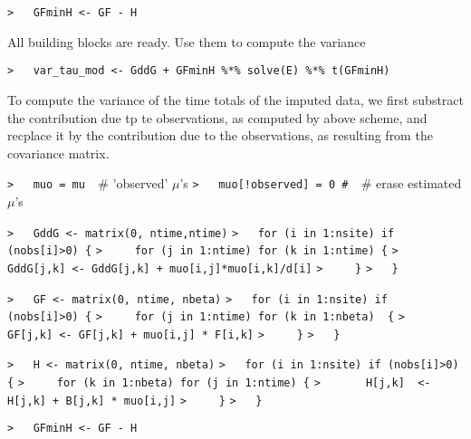 \documentclass[a4paper]{article}
\begin{document}
\verb~>   GFminH <- GF - H~\par

All building blocks are ready. Use them to compute the variance\par
\verb~>   var_tau_mod <- GddG + GFminH %*% solve(E) %*% t(GFminH)~\par

To compute the variance of the time totals of the imputed data, we first
substract the contribution due tp te observations, as computed by above scheme,
and recplace it by the contribution due to the observations, as resulting from the
covariance matrix.\par
\verb~>   muo = mu  ~{\sffamily\# 'observed' $\mu$'s}\newline
\verb~>   muo[!observed] = 0 #  ~{\sffamily\# erase estimated $\mu$'s}\par

\verb~>   GddG <- matrix(0, ntime,ntime)~\newline
\verb~>   for (i in 1:nsite) if (nobs[i]>0) {~\newline
\verb~>     for (j in 1:ntime) for (k in 1:ntime) {~\newline
\verb~>       GddG[j,k] <- GddG[j,k] + muo[i,j]*muo[i,k]/d[i]~\newline
\verb~>     }~\newline
\verb~>   }~\par

\verb~>   GF <- matrix(0, ntime, nbeta)~\newline
\verb~>   for (i in 1:nsite) if (nobs[i]>0) {~\newline
\verb~>     for (j in 1:ntime) for (k in 1:nbeta)  {~\newline
\verb~>       GF[j,k] <- GF[j,k] + muo[i,j] * F[i,k]~\newline
\verb~>     }~\newline
\verb~>   }~\par

\verb~>   H <- matrix(0, ntime, nbeta)~\newline
\verb~>   for (i in 1:nsite) if (nobs[i]>0) {~\newline
\verb~>     for (k in 1:nbeta) for (j in 1:ntime) {~\newline
\verb~>       H[j,k]  <- H[j,k] + B[j,k] * muo[i,j]~\newline
\verb~>     }~\newline
\verb~>   }~\par

\verb~>   GFminH <- GF - H~\par
\end{document}
